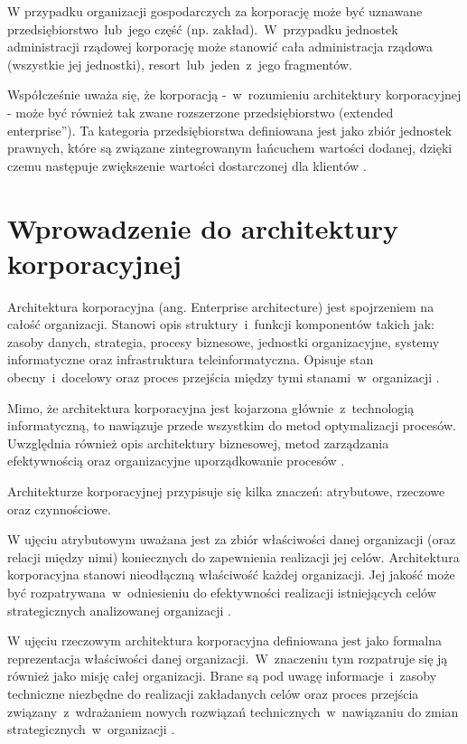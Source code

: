 W przypadku organizacji gospodarczych za korporację może być uznawane przedsiębiorstwo~lub~jego część (np. zakład).~W~przypadku jednostek administracji rządowej korporację może stanowić cała administracja rządowa (wszystkie jej jednostki), resort~lub~jeden~z~jego fragmentów.

Współcześnie uważa się, że korporacją -~w~rozumieniu architektury korporacyjnej - może być również tak zwane rozszerzone przedsiębiorstwo (\quotedblbase extended enterprise\textquotedblright). Ta kategoria przedsiębiorstwa definiowana jest jako zbiór jednostek prawnych, które są związane zintegrowanym łańcuchem wartości dodanej, dzięki czemu następuje zwiększenie wartości dostarczonej dla klientów \cite{SobArchKorpDobrPr}.

\section{Wprowadzenie do architektury korporacyjnej}
Architektura korporacyjna (ang. Enterprise architecture) jest spojrzeniem na całość organizacji. Stanowi opis struktury~i~funkcji komponentów takich jak: zasoby danych, strategia, procesy biznesowe, jednostki organizacyjne, systemy informatyczne oraz infrastruktura teleinformatyczna. Opisuje stan obecny~i~docelowy oraz proces przejścia między tymi stanami~w~organizacji \cite{ArchKorpSob}.

Mimo, że architektura korporacyjna jest kojarzona głównie~z~technologią informatyczną, to nawiązuje przede wszystkim do metod optymalizacji procesów. Uwzględnia również opis architektury biznesowej, metod zarządzania efektywnością oraz organizacyjne uporządkowanie procesów \cite{ArchKorpSzymSup}.

Architekturze korporacyjnej przypisuje się kilka znaczeń: atrybutowe, rzeczowe oraz czynnościowe.

W ujęciu atrybutowym uważana jest za zbiór właściwości danej organizacji (oraz relacji między nimi) koniecznych do zapewnienia realizacji jej celów. Architektura korporacyjna stanowi nieodłączną właściwość każdej organizacji. Jej jakość może być rozpatrywana~w~odniesieniu do efektywności realizacji istniejących celów strategicznych analizowanej organizacji \cite{ArchKorpSob}.

W ujęciu rzeczowym architektura korporacyjna definiowana jest jako formalna reprezentacja właściwości danej organizacji.~W~znaczeniu tym rozpatruje się ją również jako misję całej organizacji. Brane są pod uwagę informacje~i~zasoby techniczne niezbędne do realizacji zakładanych celów oraz proces przejścia związany~z~wdrażaniem nowych rozwiązań technicznych~w~nawiązaniu do zmian strategicznych~w~organizacji \cite{ArchKorpSob}.

